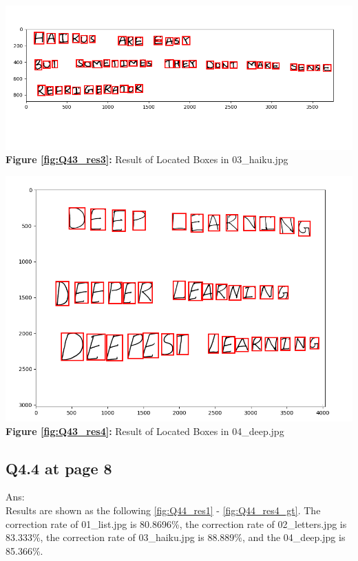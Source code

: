 \documentclass{article}
\begin{document}
	\begin{minipage}{0.48\linewidth}
		\centering
		\includegraphics[width=\linewidth]{./Q43_res3.png}
		\textbf{Figure \ref{fig:Q43_res3}:} Result of Located Boxes in 03\_haiku.jpg %
		\label{fig:Q43_res3}         %
	\end{minipage}
	\hfill
	\begin{minipage}{0.48\linewidth}
		\centering
		\includegraphics[width=\linewidth]{./Q43_res4.png}
		\textbf{Figure \ref{fig:Q43_res4}:} Result of Located Boxes in 04\_deep.jpg  %
		\label{fig:Q43_res4}         %
	\end{minipage}	
	\newline
	
	\newpage
	\subsection*{Q4.4 at page 8}
	Ans:\\
	Results are shown as the following \autoref{fig:Q44_res1} - \autoref{fig:Q44_res4_gt}. The correction rate of 01\_list.jpg is 80.8696\%, the correction rate of 02\_letters.jpg is 83.333\%, the correction rate of 03\_haiku.jpg is 88.889\%, and the 04\_deep.jpg is 85.366\%.
	
\end{document}
